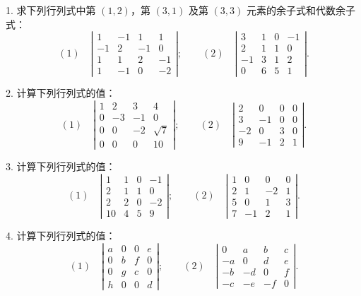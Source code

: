 \documentclass[UTF8, 12pt, fontset=fandol, oneside]{ctexart}
\begin{document}
1. 求下列行列式中第 $(1,2)$，第 $(3,1)$ 及第 $(3,3)$ 元素的余子式和代数余子式：
\[
(1)\quad
\left|\begin{array}{rrrr}
1 & -1 & 1 & 1\\
-1 & 2 & -1 & 0\\
1 & 1 & 2 & -1\\
1 & -1 & 0 & -2
\end{array}\right|;\qquad
(2)\quad
\left|\begin{array}{rrrr}
3 & 1 & 0 & -1\\
2 & 1 & 1 & 0\\
-1 & 3 & 1 & 2\\
0 & 6 & 5 & 1
\end{array}\right|.
\]

2. 计算下列行列式的值：
\[
(1)\quad
\left|\begin{array}{rrrr}
1 & 2 & 3 & 4\\
0 & -3 & -1 & 0\\
0 & 0 & -2 & \sqrt{7}\\
0 & 0 & 0 & 10
\end{array}\right|;\qquad
(2)\quad
\left|\begin{array}{rrrr}
2 & 0 & 0 & 0\\
3 & -1 & 0 & 0\\
-2 & 0 & 3 & 0\\
9 & -1 & 2 & 1
\end{array}\right|.
\]

3. 计算下列行列式的值：
\[
(1)\quad
\left|\begin{array}{rrrr}
1 & 1 & 0 & -1\\
2 & 1 & 1 & 0\\
2 & 2 & 0 & -2\\
10 & 4 & 5 & 9
\end{array}\right|;\qquad
(2)\quad
\left|\begin{array}{rrrr}
1 & 0 & 0 & 0\\
2 & 1 & -2 & 1\\
5 & 0 & 1 & 3\\
7 & -1 & 2 & 1
\end{array}\right|.
\]

4. 计算下列行列式的值：
\[
(1)\quad
\left|\begin{array}{cccc}
a & 0 & 0 & e\\
0 & b & f & 0\\
0 & g & c & 0\\
h & 0 & 0 & d
\end{array}\right|;\qquad
(2)\quad
\left|\begin{array}{rrrr}
0 & a & b & c\\
-a & 0 & d & e\\
-b & -d & 0 & f\\
-c & -e & -f & 0
\end{array}\right|.
\]
\end{document}
